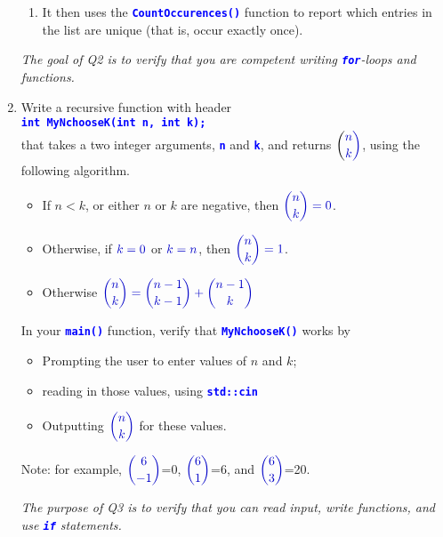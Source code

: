\documentclass[a4paper, 10pt]{article}
\newcommand {\eqd}[1]{$\displaystyle \DBlue{#1}$}
\newcommand{\DBlue}[1]{\textcolor{darkblue}{#1}}
\newcommand{\code}[1]{{\textcolor{blue}{\texttt{\textbf{#1}}}}}
\newcommand{\cnset}[1]{\lstset{language=C++,
    showstringspaces=false, 
    basicstyle=\ttfamily\footnotesize,
    keywordstyle=\color{blue}\footnotesize,
    commentstyle=\color{black!60}\rmfamily\scriptsize,
    frame=single,
    backgroundcolor=\color{BG},
    texcl=true,
    linewidth=#1\textwidth,
    numbers=left,
    numberstyle=\footnotesize,  stepnumber=2,
    numbersep=5pt,
    numberblanklines=false}%
}
\newenvironment{AnswerBlock}
{\begin{tcolorbox}[colback=yellow!15]\textbf{Answer: }}{\end{tcolorbox}}
\newif\ifAnswer
\def\AnsText#1{\ifAnswer%
  \begin{AnswerBlock}#1
  \end{AnswerBlock}\else\relax\fi}
\begin{document}
\begin{enumerate}[{Q}1]
\begin{enumerate}
\item It then uses the \code{CountOccurences()} function to report
  which entries in the list are unique (that is, occur exactly once).
\end{enumerate}
    

    \emph{The goal of Q2 is to verify that you are competent writing
      \code{for}-loops and functions.}
\AnsText{\small 
  \cnset{1}

}

\dotfill


\item  Write a recursive function with header\\
  \code{int MyNchooseK(int n, int k);}\\
  that 
  takes a two integer arguments, \code{n} and \code{k}, and
  returns \eqd{n \choose k}, using the following algorithm.
  \begin{itemize}
  \item If $n<k$, or either $n$ or $k$ are negative,
    then \eqd{ {n \choose k} =0}.
  \item Otherwise, if \eqd{k=0} or \eqd{k=n}, then
    \eqd{ {n \choose k} =1}.
  \item Otherwise \eqd{{n \choose k}= {n-1 \choose k-1} + {n-1 \choose k}}
  \end{itemize}
        
  In your \code{main()} function, verify that \code{MyNchooseK()}
   works by
  \begin{itemize}
  \item  Prompting the user to enter values of $n$ and $k$;
  \item reading in those values, using \code{std::cin}
  \item Outputting \eqd{ {n \choose k}} for these values.
  \end{itemize}

  Note: for example, \eqd{ {6 \choose -1}}=0,
  \eqd{ {6 \choose 1}}=6, and 
  \eqd{ {6 \choose 3}}=20.
  
  \emph{The purpose of Q3 is to verify that you can read input,
    write functions, and use \code{if} statements.}
        \AnsText{\small 
  \cnset{1}

}

\end{enumerate}
\end{document}
